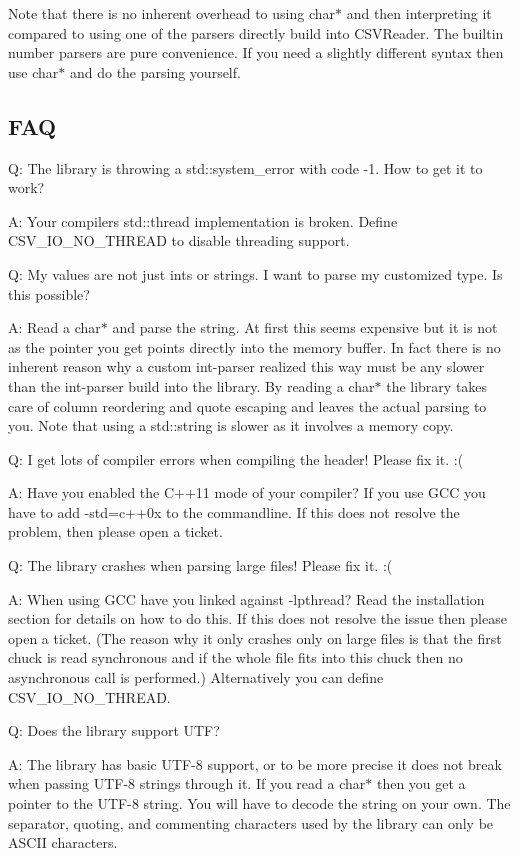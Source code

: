 Note that there is no inherent overhead to using {\ttfamily char$\ast$} and then interpreting it compared to using one of the parsers directly build into {\ttfamily C\+S\+V\+Reader}. The builtin number parsers are pure convenience. If you need a slightly different syntax then use {\ttfamily char$\ast$} and do the parsing yourself.

\subsection*{F\+AQ}

Q\+: The library is throwing a std\+::system\+\_\+error with code -\/1. How to get it to work?

A\+: Your compiler\textquotesingle{}s std\+::thread implementation is broken. Define C\+S\+V\+\_\+\+I\+O\+\_\+\+N\+O\+\_\+\+T\+H\+R\+E\+AD to disable threading support.

Q\+: My values are not just ints or strings. I want to parse my customized type. Is this possible?

A\+: Read a {\ttfamily char$\ast$} and parse the string. At first this seems expensive but it is not as the pointer you get points directly into the memory buffer. In fact there is no inherent reason why a custom int-\/parser realized this way must be any slower than the int-\/parser build into the library. By reading a {\ttfamily char$\ast$} the library takes care of column reordering and quote escaping and leaves the actual parsing to you. Note that using a std\+::string is slower as it involves a memory copy.

Q\+: I get lots of compiler errors when compiling the header! Please fix it. \+:(

A\+: Have you enabled the C++11 mode of your compiler? If you use G\+CC you have to add -\/std=c++0x to the commandline. If this does not resolve the problem, then please open a ticket.

Q\+: The library crashes when parsing large files! Please fix it. \+:(

A\+: When using G\+CC have you linked against -\/lpthread? Read the installation section for details on how to do this. If this does not resolve the issue then please open a ticket. (The reason why it only crashes only on large files is that the first chuck is read synchronous and if the whole file fits into this chuck then no asynchronous call is performed.) Alternatively you can define C\+S\+V\+\_\+\+I\+O\+\_\+\+N\+O\+\_\+\+T\+H\+R\+E\+AD.

Q\+: Does the library support U\+TF?

A\+: The library has basic U\+T\+F-\/8 support, or to be more precise it does not break when passing U\+T\+F-\/8 strings through it. If you read a {\ttfamily char$\ast$} then you get a pointer to the U\+T\+F-\/8 string. You will have to decode the string on your own. The separator, quoting, and commenting characters used by the library can only be A\+S\+C\+II characters. 